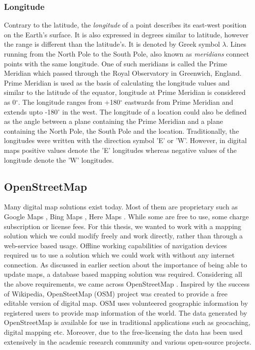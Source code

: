 \subsubsection{Longitude}
Contrary to the latitude, the \textit{longitude} of a point describes its east-west position on the Earth's surface. It is also expressed in degrees similar to latitude, however the range is different than the latitude's. It is denoted by Greek symbol $\lambda$. Lines running from the North Pole to the South Pole, also known as \textit{meridians} connect points with the same longitude. One of such meridians is called the Prime Meridian which passed through the Royal Observatory in Greenwich, England. Prime Meridian is used as the basis of calculating the longitude values and similar to the latitude of the equator, longitude at Prime Meridian is considered as 0$^{\circ}$. The longitude ranges from +180$^{\circ}$ eastwards from Prime Meridian and extends upto -180$^{\circ}$ in the west. The longitude of a location could also be defined as the angle between a plane containing the Prime Meridian and a plane containing the North Pole, the South Pole and the location. Traditionally, the longitudes were written with the direction symbol 'E' or 'W'. However, in digital maps positive values denote the 'E' longitudes whereas negative values of the longitude denote the 'W' longitudes.

\subsection{OpenStreetMap} \label{osm}
Many digital map solutions exist today. Most of them are proprietary such as Google Maps \cite{googlemaps}, Bing Maps \cite{bingmaps}, Here Maps \cite{heremaps}. While some are free to use, some charge subscription or license fees. For this thesis, we wanted to work with a mapping solution which we could modify freely and work directly, rather than through a web-service based usage. Offline working capabilities of navigation devices required us to use a solution which we could work with without any internet connection. As discussed in earlier section about the importance of being able to update maps, a database based mapping solution was required. Considering all the above requirements, we came across OpenStreetMap \cite{osmmaps}. Inspired by the success of Wikipedia, OpenSteetMap (OSM) project was created to provide a free editable version of digital map. OSM uses volunteered geographic information by registered users to provide map information of the world. The data generated by OpenStreetMap is available for use in traditional applications such as geocaching, digital mapping etc. Moreover, due to the free-licensing the data has been used extensively in the academic research community and various open-source projects. \\

